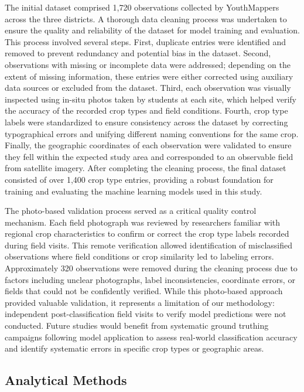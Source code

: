\documentclass[
  journal,
  twocolumn]{IEEEtran}
\begin{document}
The initial dataset comprised 1,720 observations collected by
YouthMappers across the three districts. A thorough data cleaning
process was undertaken to ensure the quality and reliability of the
dataset for model training and evaluation. This process involved several
steps. First, duplicate entries were identified and removed to prevent
redundancy and potential bias in the dataset. Second, observations with
missing or incomplete data were addressed; depending on the extent of
missing information, these entries were either corrected using auxiliary
data sources or excluded from the dataset. Third, each observation was
visually inspected using in-situ photos taken by students at each site,
which helped verify the accuracy of the recorded crop types and field
conditions. Fourth, crop type labels were standardized to ensure
consistency across the dataset by correcting typographical errors and
unifying different naming conventions for the same crop. Finally, the
geographic coordinates of each observation were validated to ensure they
fell within the expected study area and corresponded to an observable
field from satellite imagery. After completing the cleaning process, the
final dataset consisted of over 1,400 crop type entries, providing a
robust foundation for training and evaluating the machine learning
models used in this study.

The photo-based validation process served as a critical quality control
mechanism. Each field photograph was reviewed by researchers familiar
with regional crop characteristics to confirm or correct the crop type
labels recorded during field visits. This remote verification allowed
identification of misclassified observations where field conditions or
crop similarity led to labeling errors. Approximately 320 observations
were removed during the cleaning process due to factors including
unclear photographs, label inconsistencies, coordinate errors, or fields
that could not be confidently verified. While this photo-based approach
provided valuable validation, it represents a limitation of our
methodology: independent post-classification field visits to verify
model predictions were not conducted. Future studies would benefit from
systematic ground truthing campaigns following model application to
assess real-world classification accuracy and identify systematic errors
in specific crop types or geographic areas.

\subsection{Analytical Methods}\label{analytical-methods}
\end{document}
